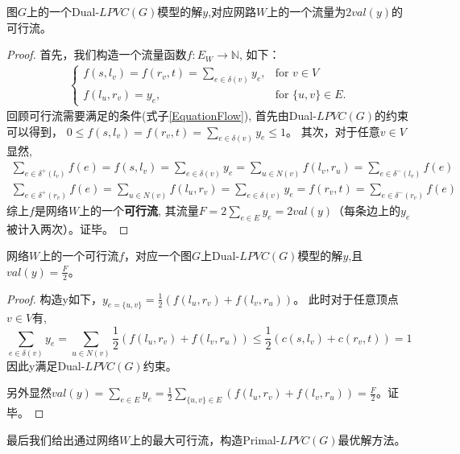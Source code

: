 \begin{property}
图$G$上的一个Dual-$LPVC(G)$模型的解$y$,对应网路$W$上的一个流量为$2val(y)$的可行流。
\end{property}
\begin{proof}
  首先，我们构造一个流量函数$f:E_W \rightarrow \mathbb{N}$, 如下：
  \begin{equation*}\begin{aligned} \begin{cases}
    f(s, l_v) = f(r_v, t) = \sum\limits_{e \in \delta(v)}{y_e}, & \mbox{for } v \in V \\
    f(l_u, r_v) = y_e, & \mbox{for } \{u, v\} \in E.
  \end{cases}\end{aligned}\end{equation*}
  回顾可行流需要满足的条件(式子\ref{EquationFlow}), 首先由Dual-$LPVC(G)$的约束可以得到，
  $0 \le f(s, l_v) = f(r_v, t) = \sum\limits_{e \in \delta(v)}{y_e} \le 1$。
  其次，对于任意$v \in V$ 显然,
  \[ \begin{aligned}
     \sum_{e\in \delta^+(l_v)}{f(e)} = f(s, l_v) = \sum\limits_{e \in \delta(v)}{y_e} = \sum_{u \in N(v)}{f(l_v, r_u)} = \sum_{e\in \delta^-(l_v)}{f(e)} \\
    \sum_{e\in \delta^+(r_v)}{f(e)} = \sum_{u \in N(v)}{f(l_u, r_v)}  = \sum\limits_{e \in \delta(v)}{y_e} = f(r_v, t) = \sum_{e\in \delta^-(r_v)}{f(e)}
  \end{aligned} \]
  综上$f$是网络$W$上的一个\textbf{可行流}, 其流量$F = 2\sum_{e \in E}{y_e} = 2val(y)$（每条边上的$y_e$被计入两次）。证毕。
\end{proof}

\begin{property}
网络$W$上的一个可行流$f$，对应一个图$G$上Dual-$LPVC(G)$模型的解$y$,且$val(y) = \frac{F}{2}$。
\end{property}
\begin{proof}
构造y如下，$y_{e = \{u, v\}} = \frac{1}{2}(f(l_u, r_v) + f(l_v, r_u))$。
此时对于任意顶点$v \in V$有,
\[\sum\limits_{e \in \delta(v)}{y_e} = \sum\limits_{u \in N(v)}{\frac{1}{2}(f(l_u, r_v) + f(l_v, r_u))} \le \frac{1}{2}(c(s, l_v) + c(r_v, t)) = 1\]
因此y满足Dual-$LPVC(G)$约束。

另外显然$val(y) = \sum_{e \in E}{y_e} = \frac{1}{2}\sum\limits_{\{u, v\}\in E}{(f(l_u, r_v) + f(l_v, r_u))} = \frac{F}{2}$。证毕。
\end{proof}

最后我们给出通过网络$W$上的最大可行流，构造Primal-$LPVC(G)$最优解方法。

